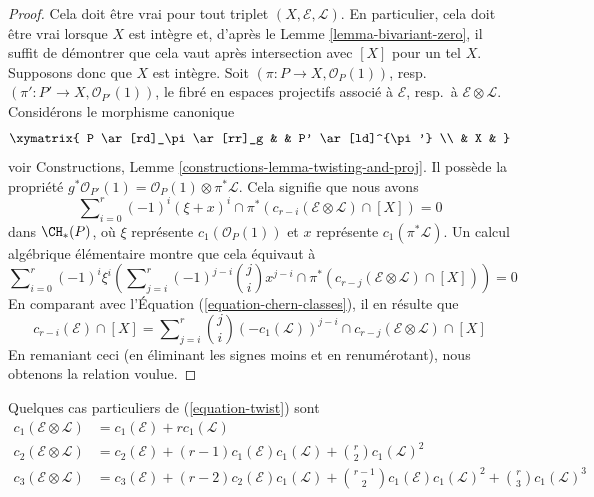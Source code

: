 \begin{proof}
Cela doit être vrai pour tout triplet $(X, \mathcal{E}, \mathcal{L})$.
En particulier, cela doit être vrai lorsque $X$ est intègre et, d'après le
Lemme \ref{lemma-bivariant-zero},
il suffit de démontrer
que cela vaut après intersection avec $[X]$ pour un tel $X$. Supposons donc
que $X$ est intègre. Soit $(\pi : P \to X, \mathcal{O}_P(1))$,
resp.\ $(\pi' : P' \to X, \mathcal{O}_{P'}(1))$, le
fibré en espaces projectifs associé à $\mathcal{E}$,
resp.\ à $\mathcal{E} \otimes \mathcal{L}$. Considérons le morphisme canonique
$$
\xymatrix{
P \ar[rd]_\pi \ar[rr]_g & & P' \ar[ld]^{\pi'} \\
& X &
}
$$
voir Constructions, Lemme \ref{constructions-lemma-twisting-and-proj}.
Il possède la propriété
$g^*\mathcal{O}_{P'}(1)
= \mathcal{O}_P(1) \otimes \pi^* {\mathcal L}$.
Cela signifie que nous avons
$$
\sum\nolimits_{i = 0}^r
(-1)^i
(\xi + x)^i \cap \pi^*(c_{r - i}(\mathcal{E} \otimes \mathcal{L}) \cap [X])
=
0
$$
dans $\CH_*(P)$, où $\xi$ représente
$c_1(\mathcal{O}_P(1))$ et $x$
représente $c_1(\pi^*\mathcal{L})$. Un calcul algébrique élémentaire montre que cela
équivaut à
$$
\sum\nolimits_{i = 0}^r
(-1)^i \xi^i \left(
\sum\nolimits_{j = i}^r
(-1)^{j - i}
\binom{j}{i}
x^{j - i} \cap
\pi^*(c_{r - j}(\mathcal{E} \otimes \mathcal{L}) \cap [X])
\right)
=
0
$$
En comparant avec
l'Équation (\ref{equation-chern-classes}), il en résulte que
$$
c_{r - i}(\mathcal{E}) \cap [X] =
\sum\nolimits_{j = i}^r
\binom{j}{i}
(-c_1(\mathcal{L}))^{j - i} \cap
c_{r - j}(\mathcal{E} \otimes \mathcal{L}) \cap [X]
$$
En remaniant ceci (en éliminant les signes moins et en renumérotant), nous obtenons
la relation voulue.
\end{proof}

\noindent
Quelques cas particuliers de (\ref{equation-twist}) sont
\begin{align*}
c_1(\mathcal{E} \otimes \mathcal{L})
& =
c_1(\mathcal{E}) +
r c_1(\mathcal{L}) \\
c_2(\mathcal{E} \otimes \mathcal{L})
& =
c_2(\mathcal{E}) +
(r - 1) c_1(\mathcal{E}) c_1(\mathcal{L}) +
\binom{r}{2} c_1(\mathcal{L})^2 \\
c_3(\mathcal{E} \otimes \mathcal{L})
& =
c_3(\mathcal{E}) +
(r - 2) c_2(\mathcal{E})c_1(\mathcal{L}) +
\binom{r - 1}{2} c_1(\mathcal{E})c_1(\mathcal{L})^2 +
\binom{r}{3} c_1(\mathcal{L})^3
\end{align*}








